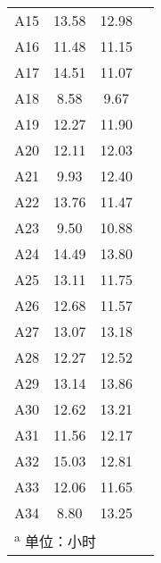 \documentclass[cn, 11pt, fancy, hide]{elegantbook}
\begin{document}
\begin{table}[!h]
\begin{tabular}{lccc}
\rowcolor{gray!6}  A15 & 13.58 & 12.98 & \multicolumn{1}{r}{\cellcolor[HTML]{db735c}{\textcolor{black}{0.6}}}\\
A16 & 11.48 & 11.15 & \multicolumn{1}{r}{\cellcolor[HTML]{db735c}{\textcolor{black}{0.33}}}\\
\rowcolor{gray!6}  A17 & 14.51 & 11.07 & \multicolumn{1}{r}{\cellcolor[HTML]{db735c}{\textcolor{black}{3.45}}}\\
A18 & 8.58 & 9.67 & \multicolumn{1}{r}{\cellcolor[HTML]{F3C57B}{\textcolor{black}{-1.09}}}\\
\rowcolor{gray!6}  A19 & 12.27 & 11.90 & \multicolumn{1}{r}{\cellcolor[HTML]{db735c}{\textcolor{black}{0.37}}}\\
A20 & 12.11 & 12.03 & \multicolumn{1}{r}{\cellcolor[HTML]{db735c}{\textcolor{black}{0.08}}}\\
\rowcolor{gray!6}  A21 & 9.93 & 12.40 & \multicolumn{1}{r}{\cellcolor[HTML]{F3C57B}{\textcolor{black}{-2.47}}}\\
A22 & 13.76 & 11.47 & \multicolumn{1}{r}{\cellcolor[HTML]{db735c}{\textcolor{black}{2.29}}}\\
\rowcolor{gray!6}  A23 & 9.50 & 10.88 & \multicolumn{1}{r}{\cellcolor[HTML]{F3C57B}{\textcolor{black}{-1.38}}}\\
A24 & 14.49 & 13.80 & \multicolumn{1}{r}{\cellcolor[HTML]{db735c}{\textcolor{black}{0.68}}}\\
\rowcolor{gray!6}  A25 & 13.11 & 11.75 & \multicolumn{1}{r}{\cellcolor[HTML]{db735c}{\textcolor{black}{1.36}}}\\
A26 & 12.68 & 11.57 & \multicolumn{1}{r}{\cellcolor[HTML]{db735c}{\textcolor{black}{1.11}}}\\
\rowcolor{gray!6}  A27 & 13.07 & 13.18 & \multicolumn{1}{r}{\cellcolor[HTML]{F3C57B}{\textcolor{black}{-0.11}}}\\
A28 & 12.27 & 12.52 & \multicolumn{1}{r}{\cellcolor[HTML]{F3C57B}{\textcolor{black}{-0.25}}}\\
\rowcolor{gray!6}  A29 & 13.14 & 13.86 & \multicolumn{1}{r}{\cellcolor[HTML]{F3C57B}{\textcolor{black}{-0.72}}}\\
A30 & 12.62 & 13.21 & \multicolumn{1}{r}{\cellcolor[HTML]{F3C57B}{\textcolor{black}{-0.59}}}\\
\rowcolor{gray!6}  A31 & 11.56 & 12.17 & \multicolumn{1}{r}{\cellcolor[HTML]{F3C57B}{\textcolor{black}{-0.62}}}\\
A32 & 15.03 & 12.81 & \multicolumn{1}{r}{\cellcolor[HTML]{db735c}{\textcolor{black}{2.22}}}\\
\rowcolor{gray!6}  A33 & 12.06 & 11.65 & \multicolumn{1}{r}{\cellcolor[HTML]{db735c}{\textcolor{black}{0.41}}}\\
A34 & 8.80 & 13.25 & \multicolumn{1}{r}{\cellcolor[HTML]{F3C57B}{\textcolor{black}{-4.44}}}\\
\bottomrule
\multicolumn{4}{l}{\textsuperscript{a} 单位：小时}\\
\end{tabular}
\end{table}
\end{document}
